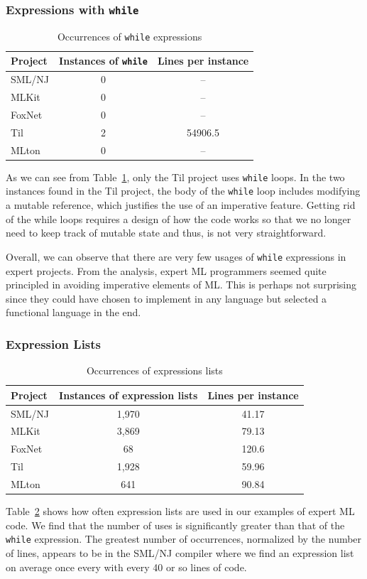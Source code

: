 \documentclass[12pt,abstracton]{scrartcl}
\begin{document}
\subsubsection{Expressions with \texttt{while}}
\begin{table}[h!]
\centering
\begin{tabular}{|l||c|c|}
\hline
Project & Instances of \texttt{while} & Lines per instance \\ \hline\hline
SML/NJ & 0 & --\\
MLKit & 0 & --\\
FoxNet & 0 & -- \\
Til & 2 & 54906.5 \\
MLton & 0 & --\\ \hline
\end{tabular}
\caption{Occurrences of \texttt{while} expressions}
\label{table:while}
\end{table}
As we can see from Table~\ref{table:while}, only the Til
project uses \texttt{while} loops.
In the two instances found in the Til project, the body of the \texttt{while}
loop includes modifying a mutable reference, which justifies the use of
an imperative feature. Getting rid of the while loops requires a design of how the code works so
that we no longer need to keep track of mutable state and thus, is not very straightforward.

Overall, we can observe that there are very few usages of \texttt{while} expressions
in expert projects.
From the analysis, expert ML programmers seemed quite principled in avoiding imperative
elements of ML. This is perhaps not surprising since they could have chosen
to implement in any language but selected a functional language in the end.
\subsubsection{Expression Lists}
\begin{table}[h!]
\centering
\begin{tabular}{|l||c|c|}
\hline
Project & Instances of expression lists & Lines per instance \\ \hline\hline
SML/NJ & 1,970 & 41.17 \\
MLKit & 3,869 & 79.13 \\
FoxNet & 68 & 120.6 \\
Til & 1,928 & 59.96 \\
MLton & 641 & 90.84 \\ \hline
\end{tabular}
\caption{Occurrences of expressions lists}
\label{table:explist}
\end{table}
Table~\ref{table:explist} shows how often expression lists are used in our
examples of expert ML code. We find that the number of uses is significantly
greater than that of the \texttt{while} expression. The greatest number
of occurrences, normalized by the number of lines, appears to be in the SML/NJ
compiler where we find an expression list on average once every with every
40 or so lines of code.
\end{document}

